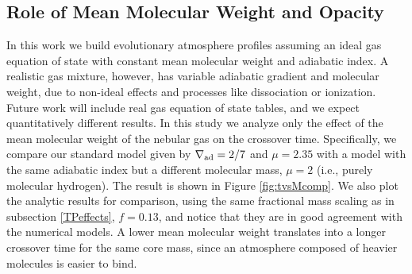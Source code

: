 \documentclass[apj]{emulateapj}
\newcommand{\delad}{\nabla_{\rm ad}}
\begin{document}



\subsection{Role of Mean Molecular Weight and Opacity}
\label{muopacity}
%
%

In this work we build evolutionary atmosphere profiles assuming an ideal gas equation of state with constant mean molecular weight and adiabatic index. A realistic gas mixture, however, has variable adiabatic gradient and molecular weight, due to non-ideal effects and processes like dissociation or ionization. Future work will include real gas equation of state tables, and we expect quantitatively different results. In this study we analyze only the effect of the mean molecular weight of the nebular gas on the crossover time.   Specifically, we compare our standard model given by $\delad=2/7$ and $\mu=2.35$ with a model with the same adiabatic index but a different molecular mass, $\mu=2$ (i.e., purely molecular hydrogen). The result is shown in Figure \ref{fig:tvsMcomp}. We also plot the analytic results for comparison, using the same fractional mass scaling as in subsection \ref{TPeffects}, $f=0.13$, and notice that they are in good agreement with the numerical models. A lower mean molecular weight translates into a longer crossover time for the same core mass, since an atmosphere composed of heavier molecules is easier to bind. 
\end{document}
